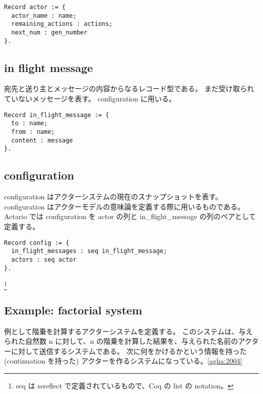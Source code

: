 \begin{lstlisting}
Record actor := {
  actor_name : name;
  remaining_actions : actions;
  next_num : gen_number
}.
\end{lstlisting}

\subsection{in flight message}
宛先と送り主とメッセージの内容からなるレコード型である。
まだ受け取られていないメッセージを表す。
configuration に用いる。

\begin{lstlisting}
Record in_flight_message := {
  to : name;
  from : name;
  content : message
}.
\end{lstlisting}

\subsection{configuration}
configuration はアクターシステムの現在のスナップショットを表す。
configuration はアクターモデルの意味論を定義する際に用いるものである。
Actario では configuration を actor の列と in\_flight\_message の列のペアとして定義する。

\begin{lstlisting}
Record config := {
  in_flight_messages : seq in_flight_message;
  actors : seq actor
}.
\end{lstlisting}

\footnote{seq は ssreflect で定義されているもので、Coq の list の notation。}

\subsection{Example: factorial system}
例として階乗を計算するアクターシステムを定義する。
このシステムは、与えられた自然数 n に対して、n の階乗を計算した結果を、与えられた名前のアクターに対して送信するシステムである。
次に何をかけるかという情報を持った (continuation を持った) アクターを作るシステムになっている。\ref{agha:2004}

